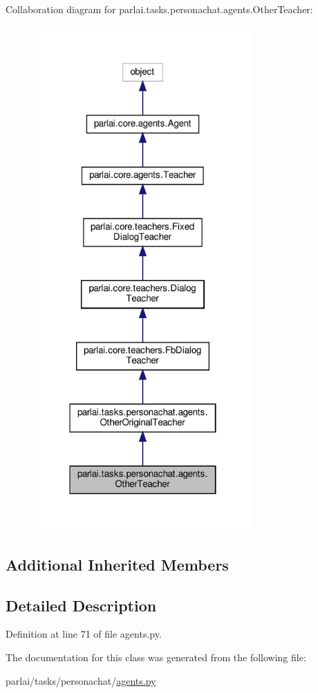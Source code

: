 Collaboration diagram for parlai.\+tasks.\+personachat.\+agents.\+Other\+Teacher\+:\nopagebreak
\begin{figure}[H]
\begin{center}
\leavevmode
\includegraphics[width=238pt]{df/dee/classparlai_1_1tasks_1_1personachat_1_1agents_1_1OtherTeacher__coll__graph}
\end{center}
\end{figure}
\subsection*{Additional Inherited Members}


\subsection{Detailed Description}


Definition at line 71 of file agents.\+py.



The documentation for this class was generated from the following file\+:\begin{DoxyCompactItemize}
\item 
parlai/tasks/personachat/\hyperlink{parlai_2tasks_2personachat_2agents_8py}{agents.\+py}\end{DoxyCompactItemize}

